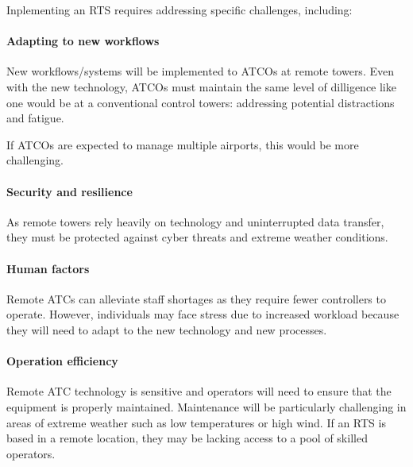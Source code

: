 Inplementing an \gls{RTS} requires addressing specific challenges, including:

\paragraph{Adapting to new workflows}
New workflows/systems will be implemented to \glspl{ATCO} at remote towers. 
Even with the new technology, \glspl{ATCO} must maintain the same level of dilligence like one would be at a conventional control towers: addressing potential distractions and fatigue.

If \glspl{ATCO} are expected to manage multiple airports, this would be more challenging. 


\paragraph{Security and resilience}
As remote towers rely heavily on technology and uninterrupted data transfer, they must be protected against cyber threats and extreme weather conditions.


\paragraph{Human factors}
Remote \glspl{ATC} can alleviate staff shortages as they require fewer controllers to operate. 
However, individuals may face stress due to increased workload because they will need to adapt to the new technology and new processes.

\paragraph{Operation efficiency}
Remote ATC technology is sensitive and operators will need to ensure that the equipment is properly maintained. 
Maintenance will be particularly challenging in areas of extreme weather such as low temperatures or high wind. 
If an RTS is based in a remote location, they may be lacking access to a pool of skilled operators.

